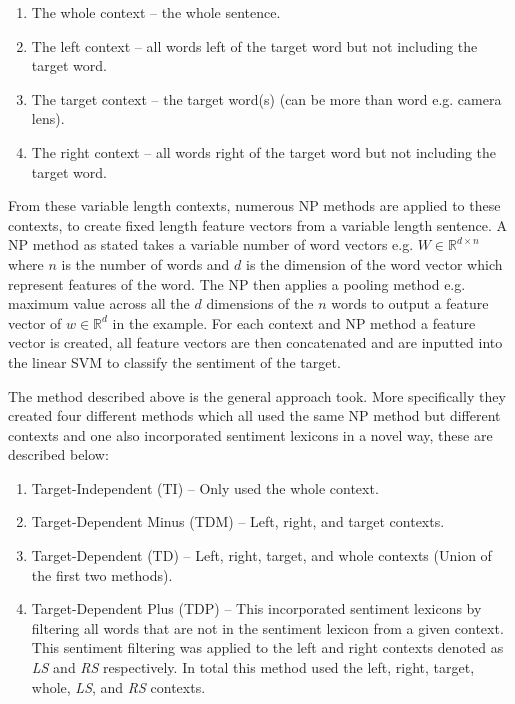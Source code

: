 \begin{enumerate}
    \item The whole context -- the whole sentence.
    \item The left context -- all words left of the target word but not including the target word.
    \item The target context -- the target word(s) (can be more than word e.g. camera lens).
    \item The right context -- all words right of the target word but not including the target word.
\end{enumerate}

From these variable length contexts, numerous NP methods are applied to these contexts, to create fixed length feature vectors from a variable length sentence. A NP method as stated takes a variable number of word vectors e.g. $W \in \mathbb{R}^{d\times n}$ where $n$ is the number of words and $d$ is the dimension of the word vector which represent features of the word. The NP then applies a pooling method e.g. maximum value across all the $d$ dimensions of the $n$ words to output a feature vector of $w \in \mathbb{R}^{d}$ in the example. For each context and NP method a feature vector is created, all feature vectors are then concatenated and are inputted into the linear SVM to classify the sentiment of the target.

The method described above is the general approach \citet{vo2015target} took. More specifically they created four different methods which all used the same NP method but different contexts and one also incorporated sentiment lexicons in a novel way, these are described below:

\begin{enumerate}
    \item Target-Independent (TI) -- Only used the whole context.
    \item Target-Dependent Minus (TDM) -- Left, right, and target contexts.
    \item Target-Dependent (TD) -- Left, right, target, and whole contexts (Union of the first two methods).
    \item Target-Dependent Plus (TDP) -- This incorporated sentiment lexicons by filtering all words that are not in the sentiment lexicon from a given context. This sentiment filtering was applied to the left and right contexts denoted as \textit{LS} and \textit{RS} respectively. In total this method used the left, right, target, whole, \textit{LS}, and \textit{RS} contexts.
\end{enumerate}


